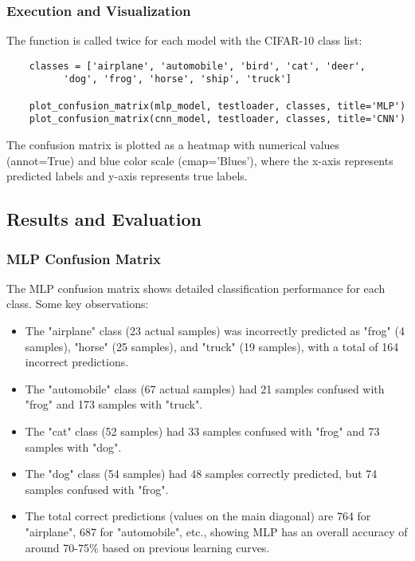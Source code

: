 \documentclass[12pt]{article}
\begin{document}
\subsubsection{Execution and Visualization}

The function is called twice for each model with the CIFAR-10 class list:

\begin{verbatim}
    classes = ['airplane', 'automobile', 'bird', 'cat', 'deer', 
          'dog', 'frog', 'horse', 'ship', 'truck']

    plot_confusion_matrix(mlp_model, testloader, classes, title='MLP')
    plot_confusion_matrix(cnn_model, testloader, classes, title='CNN')
\end{verbatim}

The confusion matrix is plotted as a heatmap with numerical values (annot=True) and 
blue color scale (cmap='Blues'), where the x-axis represents predicted labels and 
y-axis represents true labels.

\subsection{Results and Evaluation}

\subsubsection{MLP Confusion Matrix}

The MLP confusion matrix shows detailed classification performance for each class. 
Some key observations:

\begin{itemize}
    \item The "airplane" class (23 actual samples) was incorrectly predicted as 
    "frog" (4 samples), "horse" (25 samples), and "truck" (19 samples), with a 
    total of 164 incorrect predictions.
    \item The "automobile" class (67 actual samples) had 21 samples confused with 
    "frog" and 173 samples with "truck".
    \item The "cat" class (52 samples) had 33 samples confused with "frog" and 73 
    samples with "dog".
    \item The "dog" class (54 samples) had 48 samples correctly predicted, but 74 
    samples confused with "frog".
    \item The total correct predictions (values on the main diagonal) are 764 for 
    "airplane", 687 for "automobile", etc., showing MLP has an overall accuracy of 
    around 70-75\% based on previous learning curves.
\end{itemize}
\end{document}
